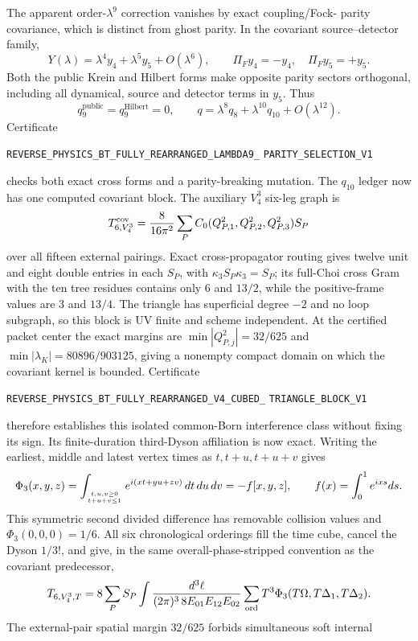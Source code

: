 \documentclass[11pt]{article}
\theoremstyle{definition}
\theoremstyle{remark}
\begin{document}
The apparent order-$\lambda^9$ correction vanishes by exact coupling/Fock-
parity covariance, which is distinct from ghost parity.  In the covariant
source--detector family,
\[
 Y(\lambda)=\lambda^4y_4+\lambda^5y_5+O(\lambda^6),\qquad
 \Pi_Fy_4=-y_4,\quad\Pi_Fy_5=+y_5.
\]
Both the public Krein and Hilbert forms make opposite parity sectors
orthogonal, including all dynamical, source and detector terms in $y_5$.
Thus
\[
 q_9^{\mathrm{public}}=q_9^{\mathrm{Hilbert}}=0,
 \qquad q=\lambda^8q_8+\lambda^{10}q_{10}+O(\lambda^{12}).
\]
Certificate
\par\noindent
\texttt{REVERSE\_PHYSICS\_BT\_FULLY\_REARRANGED\_LAMBDA9\_}
\allowbreak\texttt{PARITY\_SELECTION\_V1}
\par\noindent
checks both exact cross forms and a parity-breaking mutation.  The $q_{10}$
ledger now has one computed covariant block.  The auxiliary $V_4^3$ six-leg
graph is
\[
 T_{6,V_4^3}^{\rm cov}={8\over16\pi^2}\sum_P
 C_0(Q_{P,1}^2,Q_{P,2}^2,Q_{P,3}^2)S_P
\]
over all fifteen external pairings.  Exact cross-propagator routing gives
twelve unit and eight double entries in each $S_P$, with
$\kappa_3S_P\kappa_3=S_P$; its full-Choi cross Gram with the ten tree residues
contains only $6$ and $13/2$, while the positive-frame values are $3$ and
$13/4$.  The triangle has superficial degree $-2$ and no loop
subgraph, so this block is UV finite and scheme independent.  At the certified
packet center the exact margins are
$\min|Q_{P,j}^2|=32/625$ and
$\min|\lambda_K|=80896/903125$, giving a nonempty compact domain on which the
covariant kernel is bounded.  Certificate
\par\noindent
\texttt{REVERSE\_PHYSICS\_BT\_FULLY\_REARRANGED\_V4\_CUBED\_}
\allowbreak\texttt{TRIANGLE\_BLOCK\_V1}
\par\noindent
therefore establishes this isolated common-Born interference class without
fixing its sign.  Its finite-duration third-Dyson affiliation is now exact.
Writing the earliest, middle and latest vertex times as $t,t+u,t+u+v$ gives
\[
 \Phi_3(x,y,z)=\int_{t,u,v\geq0\atop t+u+v\leq1}
 e^{i(xt+yu+zv)}\,dt\,du\,dv=-f[x,y,z],\qquad
 f(x)=\int_0^1e^{ixs}ds .
\]
This symmetric second divided difference has removable collision values and
$\Phi_3(0,0,0)=1/6$.  All six chronological orderings fill the time cube,
cancel the Dyson $1/3!$, and give, in the same overall-phase-stripped
convention as the covariant predecessor,
\[
 T_{6,V_4^3,T}=8\sum_P S_P
 \int{d^3\ell\over(2\pi)^3\,8E_{01}E_{12}E_{02}}
 \sum_{\mathrm{ord}}T^3\Phi_3(T\Omega,T\Delta_1,T\Delta_2).
\]
The external-pair spatial margin $32/625$ forbids simultaneous soft internal
\end{document}
